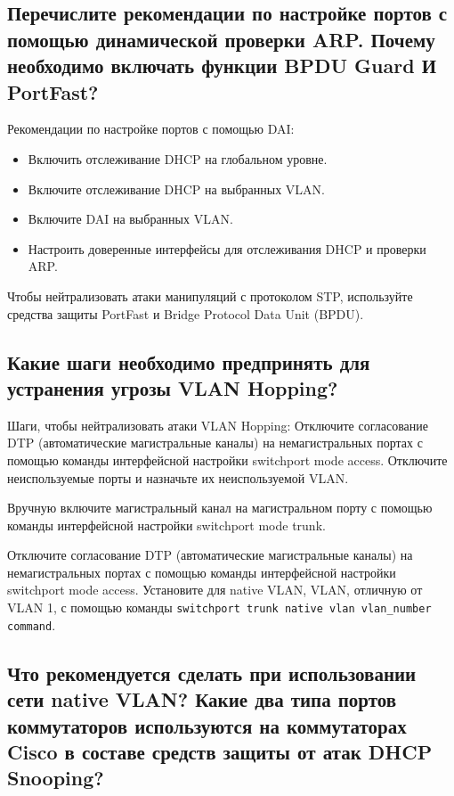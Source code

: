 \subsection{Перечислите рекомендации по настройке портов с помощью 
динамической проверки ARP. Почему необходимо включать 
функции BPDU Guard И PortFast?}

Рекомендации по настройке портов с помощью DAI:

\begin{itemize}
	\item Включить отслеживание DHCP на глобальном уровне.
	\item Включите отслеживание DHCP на выбранных VLAN.
	\item Включите DAI на выбранных VLAN.
	\item Настроить доверенные интерфейсы для отслеживания DHCP и 
		проверки ARP.
\end{itemize}

Чтобы нейтрализовать атаки манипуляций с протоколом STP, 
используйте средства защиты PortFast и Bridge Protocol Data Unit (BPDU).

\subsection{Какие шаги необходимо предпринять для устранения угрозы 
VLAN Hopping?}

Шаги, чтобы нейтрализовать атаки VLAN Hopping:
Отключите согласование DTP (автоматические магистральные 
каналы) на немагистральных портах с помощью команды 
интерфейсной настройки switchport mode access.
Отключите неиспользуемые порты и назначьте их 
неиспользуемой VLAN.\par
Вручную включите магистральный канал на магистральном 
порту с помощью команды интерфейсной настройки switchport 
mode trunk.\par
Отключите согласование DTP (автоматические магистральные 
каналы) на немагистральных портах с помощью команды 
интерфейсной настройки switchport mode access.
Установите для native VLAN, VLAN, отличную от VLAN 1, с 
помощью команды \verb|switchport trunk native vlan vlan_number command|.

\subsection{Что рекомендуется сделать при использовании сети native 
VLAN? Какие два типа портов коммутаторов используются на 
коммутаторах Cisco в составе средств защиты от атак DHCP 
Snooping?}

